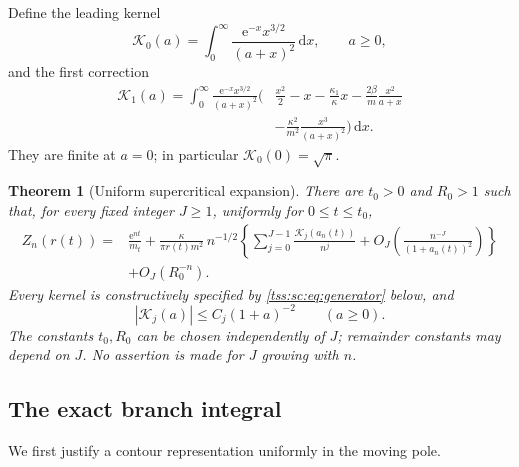 \documentclass[11pt]{article}
\newtheorem{theorem}{Theorem}[section]
\theoremstyle{remark}\newtheorem{remark}[theorem]{Remark}
\theoremstyle{definition}\newtheorem{definition}[theorem]{Definition}
\newcommand{\dd}{\mathrm d}
\newcommand{\e}{\mathrm e}
\newcommand{\Kc}{\mathcal K}
\begin{document}
Define the leading kernel
\begin{equation}\label{tss:sc:eq:K0}
 \Kc_0(a)=\int_0^\infty\frac{\e^{-x}x^{3/2}}{(a+x)^2}\,\dd x,
 \qquad a\geq0,
\end{equation}
and the first correction
\begin{equation}\label{tss:sc:eq:K1}
\begin{split}
 \Kc_1(a)=\int_0^\infty\frac{\e^{-x}x^{3/2}}{(a+x)^2}
 \biggl(&\frac{x^2}{2}-x-\frac{\kappa_1}{\kappa}x
 -\frac{2\beta}{m}\frac{x^2}{a+x}\\
 &-\frac{\kappa^2}{m^2}\frac{x^3}{(a+x)^2}\biggr)\,\dd x.
\end{split}
\end{equation}
They are finite at $a=0$; in particular $\Kc_0(0)=\sqrt\pi$.

\begin{theorem}[Uniform supercritical expansion]\label{tss:sc:thm:uniform}
There are $t_0>0$ and $R_0>1$ such that, for every fixed integer $J\geq1$, uniformly for $0\leq t\leq t_0$,
\begin{equation}\label{tss:sc:eq:uniform}
\begin{split}
 Z_n(r(t))={}&\frac{\e^{nt}}{m_t}
 +\frac{\kappa}{\pi r(t)m^2}\,n^{-1/2}
 \left\{\sum_{j=0}^{J-1}\frac{\Kc_j(a_n(t))}{n^j}
       +O_J\!\left(\frac{n^{-J}}{(1+a_n(t))^2}\right)\right\}\\
 &+O_J(R_0^{-n}).
\end{split}
\end{equation}
Every kernel is constructively specified by \eqref{tss:sc:eq:generator} below, and
\begin{equation}\label{tss:sc:eq:kernelbound}
 |\Kc_j(a)|\leq C_j(1+a)^{-2}\qquad(a\geq0).
\end{equation}
The constants $t_0,R_0$ can be chosen independently of $J$; remainder constants may depend on $J$. No assertion is made for $J$ growing with $n$.
\end{theorem}

\subsection{The exact branch integral}
We first justify a contour representation uniformly in the moving pole.
\end{document}
